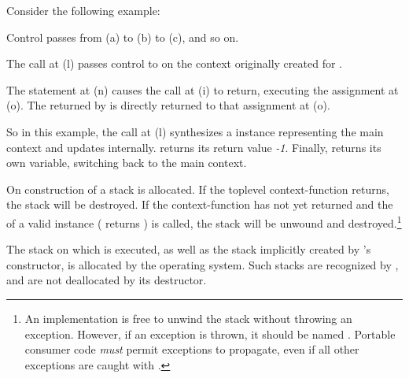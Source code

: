 Consider the following example:


Control passes from (a) to (b) to (c), and so on.

The  call at (l) passes control
to  on the context originally created for .

The  statement at (n) causes the \op call at (i) to return,
executing the assignment at (o). The  returned by 
is directly returned to that assignment at (o).

So in this example, the call at (l) synthesizes a \cont instance representing
the main context and updates  internally.  returns its
return value \emph{-1}. Finally,  returns its own 
variable, switching back to the main context.


\label{subsec:destruction}
On construction of  a stack is allocated. If the
toplevel context-function returns, the stack will be destroyed. If the
context-function has not yet returned and the  of
a valid  instance (\opbool
returns ) is called, the stack will be unwound and
destroyed.\footnote{An implementation is free to unwind the stack without
throwing an exception. However, if an exception is thrown, it should be
named . Portable consumer
code \emph{must} permit  exceptions to
propagate, even if all other exceptions are caught with .}

The stack on which  is executed, as well as the stack implicitly
created by 's constructor, is allocated by the operating
system. Such stacks are recognized by \cont, and are not deallocated by its
destructor.

